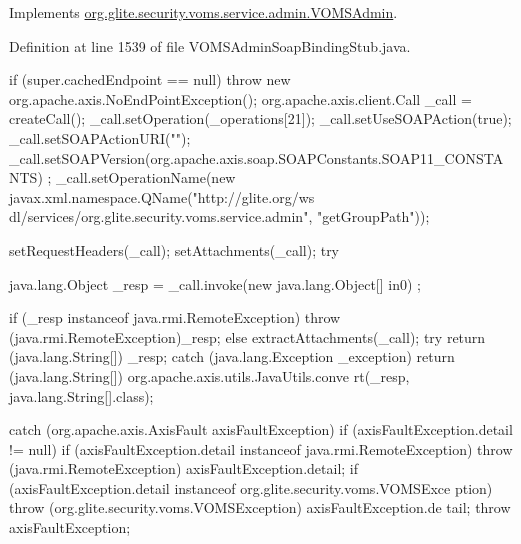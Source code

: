 Implements \hyperlink{interfaceorg_1_1glite_1_1security_1_1voms_1_1service_1_1admin_1_1VOMSAdmin_aa05d3561e3a55b86c8f623c476f58bab}{org.glite.security.voms.service.admin.VOMSAdmin}.



Definition at line 1539 of file VOMSAdminSoapBindingStub.java.


\begin{DoxyCode}
                                                                                 
                                                             {
        if (super.cachedEndpoint == null) {
            throw new org.apache.axis.NoEndPointException();
        }
        org.apache.axis.client.Call _call = createCall();
        _call.setOperation(_operations[21]);
        _call.setUseSOAPAction(true);
        _call.setSOAPActionURI("");
        _call.setSOAPVersion(org.apache.axis.soap.SOAPConstants.SOAP11_CONSTANTS)
      ;
        _call.setOperationName(new javax.xml.namespace.QName("http://glite.org/ws
      dl/services/org.glite.security.voms.service.admin", "getGroupPath"));

        setRequestHeaders(_call);
        setAttachments(_call);
 try {        java.lang.Object _resp = _call.invoke(new java.lang.Object[] {in0})
      ;

        if (_resp instanceof java.rmi.RemoteException) {
            throw (java.rmi.RemoteException)_resp;
        }
        else {
            extractAttachments(_call);
            try {
                return (java.lang.String[]) _resp;
            } catch (java.lang.Exception _exception) {
                return (java.lang.String[]) org.apache.axis.utils.JavaUtils.conve
      rt(_resp, java.lang.String[].class);
            }
        }
  } catch (org.apache.axis.AxisFault axisFaultException) {
    if (axisFaultException.detail != null) {
        if (axisFaultException.detail instanceof java.rmi.RemoteException) {
              throw (java.rmi.RemoteException) axisFaultException.detail;
         }
        if (axisFaultException.detail instanceof org.glite.security.voms.VOMSExce
      ption) {
              throw (org.glite.security.voms.VOMSException) axisFaultException.de
      tail;
         }
   }
  throw axisFaultException;
}
    }
\end{DoxyCode}
